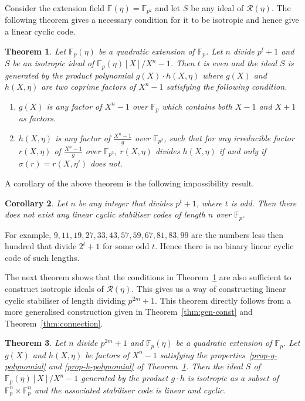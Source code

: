 \documentclass[conference]{IEEEtran}
\renewcommand{\=}{\approx}
\newcommand{\Ra}{\mathcal{R}(\eta)}
\newtheorem{theorem}{Theorem}[section]
\newtheorem{corollary}[theorem]{Corollary}
\begin{document}
Consider the extension field $\mathbb{F}(\eta)=\mathbb{F}_{p^2}$ and
let $S$ be any ideal of $\Ra$. The following theorem gives a
necessary condition for it to be isotropic and hence give a linear
cyclic code.

\begin{theorem}\label{thm:linear-necessary-condition}
  Let $\mathbb{F}_p(\eta)$ be a quadratic extension of $\mathbb{F}_p$.
 Let $n$ divide $p^t +1$ and $S$ be an isotropic ideal of
  $\mathbb{F}_p(\eta)[X]/X^n-1$. Then $t$ is even and the ideal $S$ is
  generated by the product polynomial $g(X) \cdot h(X,\eta)$ where
  $g(X)$ and $h(X,\eta)$ are two coprime factors of $X^n -1$
  satisfying the following condition.
  \begin{enumerate}
  \item \label{prop-g-polynomial} $g(X)$ is any factor of $X^n - 1$
    over $\mathbb{F}_p$ which contains both $X-1$ and $X+1$ as
    factors.
  \item \label{prop-h-polynomial} $h(X,\eta)$ is any factor of
    $\frac{X^n -1}{g}$ over $\mathbb{F}_{p^2}$, such that for any
    irreducible factor $r(X,\eta)$ of $\frac{X^n -1}{g}$ over
    $\mathbb{F}_{p^2}$, $r(X,\eta)$ divides $h(X,\eta)$ if and only if
    $\sigma(r) = r(X,\eta')$ \emph{does not}.
  \end{enumerate}
\end{theorem}

A corollary of the above theorem is the following impossibility
result.

\begin{corollary}\label{cor:nonexistance-power-odd}
  Let $n$ be any integer that divides $p^t+1$, where $t$ is odd. Then there
  does not exist any linear cyclic stabiliser codes of length $n$ over
  $\mathbb{F}_p$.
\end{corollary}

For example, $9,11,19,27,33,43,57,59,67,81,83,99$ are the numbers less
then hundred that divide $2^t+1$ for some odd $t$. Hence there is no binary
linear cyclic code of such lengths.

The next theorem shows that the conditions in
Theorem~\ref{thm:linear-necessary-condition} are also sufficient to
construct isotropic ideals of $\Ra$. This gives us a way of
constructing linear cyclic stabiliser of length dividing $p^{2m} +1$. This theorem directly follows from a more generalised construction given in Theorem~\ref{thm:gen-const} and Theorem~\ref{thm:connection}.

\begin{theorem}\label{thm:main-construction}
  Let $n$ divide $p^{2m} +1$ and $\mathbb{F}_p(\eta)$ be a quadratic
extension of $\mathbb{F}_p$. Let $g(X)$ and $h(X,\eta)$ be factors of
  $X^n -1$ satisfying the properties~\ref{prop-g-polynomial} and
  \ref{prop-h-polynomial} of
  Theorem~\ref{thm:linear-necessary-condition}.  Then the ideal $S$ of
  $\mathbb{F}_p(\eta)[X]/X^n-1$ generated by the product $g \cdot h$
 is isotropic as a subset
  of $\mathbb{F}_p^n \times \mathbb{F}_p^n$ and the associated
  stabiliser code is linear and cyclic.
\end{theorem}
\end{document}

